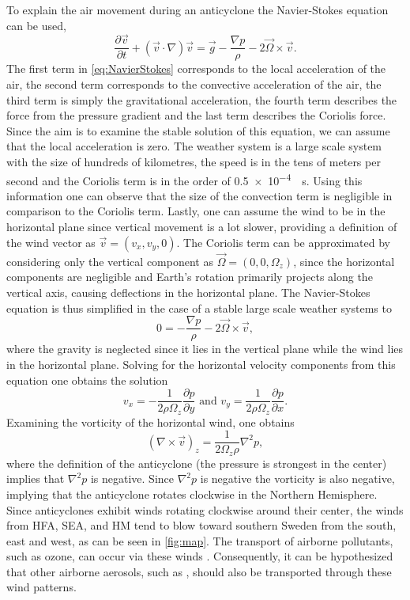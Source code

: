 To explain the air movement during an anticyclone the Navier-Stokes equation can be used,
\begin{equation} \frac{\partial \vec{v}}{\partial t} + (\vec{v} \cdot \nabla)\vec{v} = \vec{g} - \frac{\nabla p}{\rho} - 2\vec{\Omega} \times \vec{v}. \label{eq:NavierStokes} \end{equation}
The first term in \autoref{eq:NavierStokes} corresponds to the local acceleration of the air, the second term corresponds to the convective acceleration of the air, the third term is simply the gravitational acceleration, the fourth term describes the force from the pressure gradient and the last term describes the Coriolis force. Since the aim is to examine the stable solution of this equation, we can assume that the local acceleration is zero. The weather system is a large scale system with the size of hundreds of kilometres, the speed is in the tens of meters per second and the Coriolis term is in the order of \SI{0.5e-4}{\per\s}. Using this information one can observe that the size of the convection term is negligible in comparison to the Coriolis term. Lastly, one can assume the wind to be in the horizontal plane since vertical movement is a lot slower, providing a definition of the wind vector as $\vec{v}=(v_x,v_y,0)$. The Coriolis term can be approximated by considering only the vertical component as $\vec{\Omega}=(0,0,\Omega_z)$, since the horizontal components are negligible and Earth's rotation primarily projects along the vertical axis, causing deflections in the horizontal plane. The Navier-Stokes equation is thus simplified in the case of a stable large scale weather systems to
\begin{equation} 0 = - \frac{\nabla p}{\rho} - 2{\vec{\Omega}} \times \vec{v}, \label{eq:NavierStokes2} \end{equation}
where the gravity is neglected since it lies in the vertical plane while the wind lies in the horizontal plane. Solving for the horizontal velocity components from this equation one obtains the solution
\begin{equation} v_x=-\frac{1}{2\rho\Omega_z}\frac{\partial p}{\partial y}\text{ and }v_y=\frac{1}{2\rho\Omega_z}\frac{\partial p}{\partial x}. 
\end{equation}
Examining the vorticity of the horizontal wind, one obtains  
\begin{equation}
    (\nabla \times \vec{v})_z  = \frac{1}{2\Omega_z\rho}\nabla^2p,
\end{equation} 
where the definition of the anticyclone (the pressure is strongest in the center) implies that $\nabla^2p$ is negative. Since $\nabla^2p$ is negative the vorticity is also negative, implying that the anticyclone rotates clockwise in the Northern Hemisphere. Since anticyclones exhibit winds rotating clockwise around their center, the winds from HFA, SEA, and HM tend to blow toward southern Sweden from the south, east and west, as can be seen in \autoref{fig:map}. The transport of airborne pollutants, such as ozone, can occur via these winds \cite{oteroImpactAtmosphericBlocking2022}. Consequently, it can be hypothesized that other airborne aerosols, such as \PM, should also be transported through these wind patterns.

